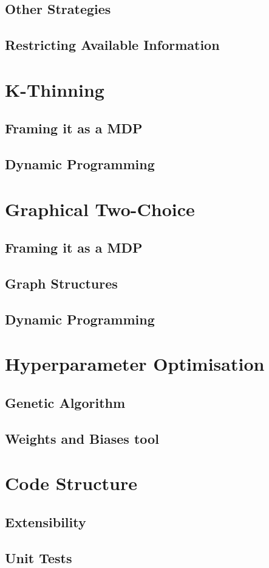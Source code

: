 \subsection{Other Strategies}


\subsection{Restricting Available Information}


\section{K-Thinning}


\subsection{Framing it as a MDP}


\subsection{Dynamic Programming}


\section{Graphical Two-Choice}


\subsection{Framing it as a MDP}


\subsection{Graph Structures}


\subsection{Dynamic Programming}


\section{Hyperparameter Optimisation}


\subsection{Genetic Algorithm}


\subsection{Weights and Biases tool}


\section{Code Structure}


\subsection{Extensibility}


\subsection{Unit Tests}

